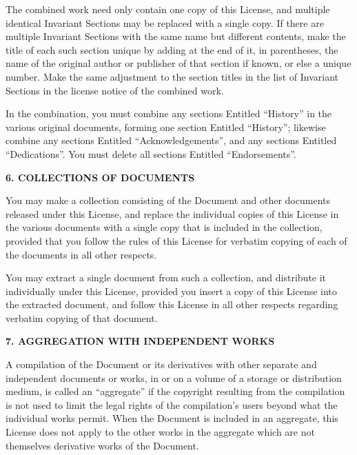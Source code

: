 \documentclass[10pt,a4paper,ngerman,titlepage,tocindentauto]{article}
\begin{document}
\begin{multicols}{3}
{				The combined work need only contain one copy of this License, and
				multiple identical Invariant Sections may be replaced with a single
				copy.  If there are multiple Invariant Sections with the same name but
				different contents, make the title of each such section unique by
				adding at the end of it, in parentheses, the name of the original
				author or publisher of that section if known, or else a unique number.
				Make the same adjustment to the section titles in the list of
				Invariant Sections in the license notice of the combined work.

				In the combination, you must combine any sections Entitled ``History''
				in the various original documents, forming one section Entitled
				``History''; likewise combine any sections Entitled ``Acknowledgements'',
				and any sections Entitled ``Dedications''.  You must delete all sections
				Entitled ``Endorsements''.

				\begin{center}
				{\bf 6. COLLECTIONS OF DOCUMENTS\par}
				\end{center}

				You may make a collection consisting of the Document and other documents
				released under this License, and replace the individual copies of this
				License in the various documents with a single copy that is included in
				the collection, provided that you follow the rules of this License for
				verbatim copying of each of the documents in all other respects.

				You may extract a single document from such a collection, and distribute
				it individually under this License, provided you insert a copy of this
				License into the extracted document, and follow this License in all
				other respects regarding verbatim copying of that document.


				\begin{center}
				{\bf 7. AGGREGATION WITH INDEPENDENT WORKS\par}
				\end{center}

				A compilation of the Document or its derivatives with other separate
				and independent documents or works, in or on a volume of a storage or
				distribution medium, is called an ``aggregate'' if the copyright
				resulting from the compilation is not used to limit the legal rights
				of the compilation's users beyond what the individual works permit.
				When the Document is included in an aggregate, this License does not
				apply to the other works in the aggregate which are not themselves
				derivative works of the Document.

}
\end{multicols}
\end{document}
